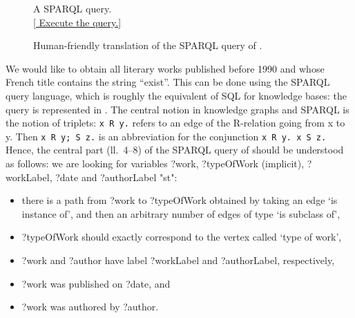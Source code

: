 \begin{figure}

	\caption{
		\label{fig:sparql}
		A SPARQL query.\\
	\href{https://query.wikidata.org/\#SELECT\%20DISTINCT\%20\%3Fwork\%20\%3FworkLabel\%20\%3FauthorLabel\%0AWHERE\%0A\%7B\%0A\%20\%20\%3Fwork\%09wdt\%3AP31\%2Fwdt\%3AP279\%2a\%20wd\%3AQ7725634\%3B\%0A\%20\%20\%20\%20\%20\%20\%20\%20rdfs\%3Alabel\%20\%3FworkLabel\%3B\%0A\%20\%20\%09\%09wdt\%3AP577\%20\%3Fdate\%3B\%0A\%20\%20\%20\%20\%20\%20\%20\%20wdt\%3AP50\%20\%3Fauthor.\%0A\%20\%20\%3Fauthor\%20rdfs\%3Alabel\%20\%3FauthorLabel.\%0A\%20\%20FILTER\%28LANG\%28\%3FworkLabel\%29\%20\%3D\%20\%22fr\%22\%20\%26\%26\%20LANG\%28\%3FauthorLabel\%29\%20\%3D\%20\%22fr\%22\%29.\%0A\%20\%20FILTER\%28CONTAINS\%28\%3FworkLabel\%2C\%20\%22exist\%22\%29\%29.\%0A\%20\%20FILTER\%28YEAR\%28\%3Fdate\%29\%20\%3C\%3D\%201990\%29.\%0A\%7D\%0ALIMIT\%207}{[\raisebox{-.4ex}{\HandRight} Execute the query.]}
	}
\end{figure}
\begin{figure}
	
	\caption{
		\label{fig:sparql-explained}
		Human-friendly translation of the SPARQL query of .
	}
\end{figure}
We would like to obtain all literary works published before 1990 and whose
French title contains the string ``exist''.
This can be done using the SPARQL query language, which is roughly the equivalent
of SQL for knowledge bases: the query is represented in .
The central notion in knowledge graphs and SPARQL is the notion of triplets:
\lstinline[language=SQL]{x R y.} refers to an edge of the \textsf{R}-relation
going from \textsf{x} to \textsf{y}.
Then \lstinline[language=SQL]{x R y; S z.} is an abbreviation for
the conjunction \lstinline[language=SQL]{x R y. x S z.}
Hence, the central part (ll.~4--8) of the SPARQL query of 
should be understood as follows:
we are looking for variables \textsf{?work}, \textsf{?typeOfWork} (implicit),
\textsf{?workLabel}, \textsf{?date} and \textsf{?authorLabel} "st":
\begin{itemize}
	\item there is a path from \textsf{?work} to \textsf{?typeOfWork}
		obtained by taking an edge `is instance of', and then an arbitrary number
		of edges of type `is subclass of',
	\item \textsf{?typeOfWork} should exactly correspond to the vertex called `type of work',
	\item \textsf{?work} and \textsf{?author} have label \textsf{?workLabel} and \textsf{?authorLabel}, respectively, 
	\item \textsf{?work} was published on \textsf{?date}, and
	\item \textsf{?work} was authored by \textsf{?author}.
\end{itemize}
